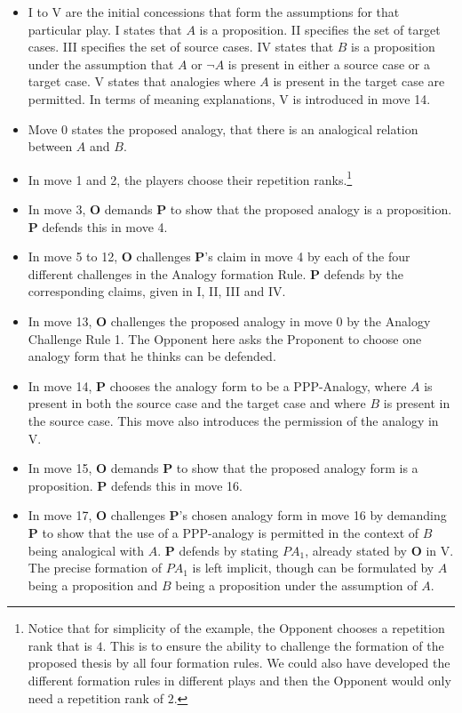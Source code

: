 					\begin{itemize}
				\item I to V are the initial concessions that form the assumptions for that particular play. I states that $A$ is a proposition. II specifies the set of target cases. III specifies the set of source cases. IV states that $B$ is a proposition under the assumption that $A$ or $\neg A$ is present in either a source case or a target case. V states that analogies where $A$ is present in the target case are permitted. In terms of meaning explanations, V is introduced in move 14. 
				\item Move 0 states the proposed analogy, that there is an analogical relation between $A$ and $B$. 
				\item In move 1 and 2, the players choose their repetition ranks.\footnote{Notice that for simplicity of the example, the Opponent chooses a repetition rank that is $4$. This is to ensure the ability to challenge the formation of the proposed thesis by all four formation rules. We could also have developed the different formation rules in different plays and then the Opponent would only need a repetition rank of $2$.}
				\item In move 3, \textbf{O} demands \textbf{P} to show that the proposed analogy is a proposition. \textbf{P} defends this in move 4.
				\item In move 5 to 12, \textbf{O} challenges \textbf{P}'s claim in move 4 by each of the four different challenges in the Analogy formation Rule. \textbf{P} defends by the corresponding claims, given in I, II, III and IV. 
				\item In move 13, \textbf{O} challenges the proposed analogy in move 0 by the Analogy Challenge Rule 1. The Opponent here asks the Proponent to choose one analogy form that he thinks can be defended.
				\item In move 14, \textbf{P} chooses the analogy form to be a PPP-Analogy, where $A$ is present in both the source case and the target case and where $B$ is present in the source case. This move also introduces the permission of the analogy in V.
				\item In move 15, \textbf{O} demands \textbf{P} to show that the proposed analogy form is a proposition. \textbf{P} defends this in move 16.
				\item In move 17, \textbf{O} challenges \textbf{P}'s chosen analogy form in move 16 by demanding \textbf{P} to show that the use of a PPP-analogy is permitted in the context of $B$ being analogical with $A$. \textbf{P} defends by stating $PA_1$, already stated by \textbf{O} in V. The precise formation of $PA_1$ is left implicit, though can be formulated by $A$ being a proposition and $B$ being a proposition under the assumption of $A$.

\end{itemize}
